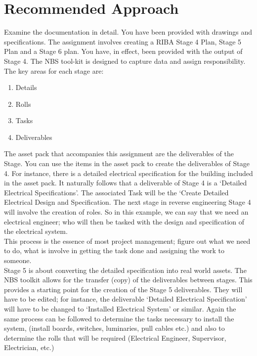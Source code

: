 \section*{Recommended Approach}
Examine the documentation in detail. You have been provided with drawings and specifications.  The assignment involves creating a RIBA Stage 4 Plan, Stage 5 Plan and a Stage 6 plan.  You have, in effect, been provided with the output of Stage 4.
The NBS tool-kit is designed to capture data and assign responsibility. The key areas for each stage are:
\begin{enumerate}
	\item Details
	\item Rolls
	\item Tasks
	\item Deliverables
\end{enumerate}

The asset pack that accompanies this assignment are the deliverables of the Stage. You can use the items in the asset pack to create the deliverables of Stage 4. For instance, there is a detailed electrical specification for the building included in the asset pack. It naturally follows that a deliverable of Stage 4 is a ‘Detailed Electrical Specifications’. The associated Task will be the ‘Create Detailed Electrical Design and Specification. The next stage in reverse engineering Stage 4 will involve the creation of roles. So in this example, we can say that we need an electrical engineer; who will then be tasked with the design and specification of the electrical system.\\


This process is the essence of most project management; figure out what we need to do, what is involve in getting the task done and assigning the work to someone.\\



Stage 5 is about converting the detailed specification into real world assets. The NBS toolkit allows for the transfer (copy) of the deliverables between stages. This provides a starting point for the creation of the Stage 5 deliverables. They will have to be edited; for instance, the deliverable ‘Detailed Electrical Specification’ will have to be changed to ‘Installed Electrical System’ or similar. Again the same process can be followed to determine the tasks necessary to install the system, (install boards, switches, luminaries, pull cables etc.) and also to determine the rolls that will be required (Electrical Engineer, Supervisor, Electrician, etc.)  \\

